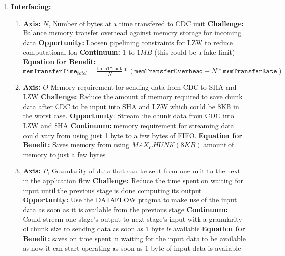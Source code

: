 \documentclass{article}
\begin{document}
\begin{enumerate}
\begin{enumerate}
\end{enumerate}
\item%
\textbf{Interfacing:}

\begin{enumerate}
\item%

\textbf{Axis:} $N$, Number of bytes at a time transfered to CDC unit
\newline
\textbf{Challenge:} Balance memory transfer overhead against memory storage for incoming data
\newline
\textbf{Opportunity:} Loosen pipelining constraints for LZW to reduce computational loa
\newline
\textbf{Continuum:} $1$ to $1MB$ (this could be a fake limit)
\newline
\textbf{Equation for Benefit:} $\texttt{memTransferTime}_{total} = \frac{\texttt{totalInput}}{N}*\left(\texttt{memTransferOverhead} + N*\texttt{memTransferRate}    \right)$

\item%

\textbf{Axis:} $O$ Memory requirement for sending data from CDC to SHA and LZW 
\newline
\textbf{Challenge:} Reduce the amount of memory required to save chunk data after CDC to be input into SHA and LZW which could be 8KB in the worst case.
\newline
\textbf{Opportunity:} Stream the chunk data from CDC into LZW and SHA
\newline
\textbf{Continuum:} memory requirement for streaming data could vary from using just 1 byte to a few bytes of FIFO.  
\newline
\textbf{Equation for Benefit:} Saves memory from using $MAX_CHUNK(8KB)$ amount of memory to just a few bytes

\item%

\textbf{Axis:} $P$, Granularity of data that can be sent from one unit to the next in the application flow
\newline
\textbf{Challenge:} Reduce the time spent on waiting for input until the previous stage is done computing its output  
\newline
\textbf{Opportunity:} Use the DATAFLOW pragma to make use of the input data as soon as it is available from the previous stage 
\newline
\textbf{Continuum:} Could stream one stage's output to next stage's input with a granularity of chunk size to sending data as soon as $1$ byte is available 
\newline
\textbf{Equation for Benefit:} saves on time spent in waiting for the input data to be available as now it can start operating as soon as $1$ byte of input data is available


\end{enumerate}
\end{enumerate}
\end{document}
